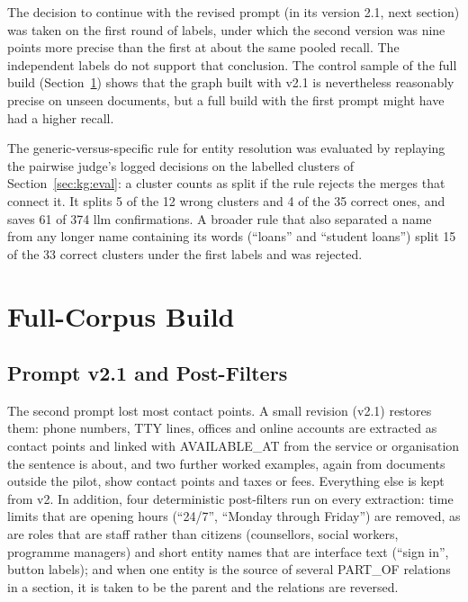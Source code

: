 The decision to continue with the revised prompt (in its version 2.1, next section) was
taken on the first round of labels, under which the second version was nine points more
precise than the first at about the same pooled recall. The independent labels do not
support that conclusion. The control sample of the full build
(Section~\ref{sec:kg:full}) shows that the graph built with v2.1 is nevertheless
reasonably precise on unseen documents, but a full build with the first prompt might have
had a higher recall.

The generic-versus-specific rule for entity resolution was evaluated by replaying the
pairwise judge's logged decisions on the labelled clusters of
Section~\ref{sec:kg:eval}: a cluster counts as split if the rule rejects the merges that
connect it. It splits 5 of the 12 wrong clusters and 4 of the 35 correct ones, and saves
61 of 374 \gls{llm} confirmations. A broader rule that also separated a name from any
longer name containing its words (``loans'' and ``student loans'') split 15 of the 33
correct clusters under the first labels and was rejected.


\section{Full-Corpus Build}\label{sec:kg:full}

\subsection{Prompt v2.1 and Post-Filters}

The second prompt lost most contact points. A small revision (v2.1) restores them:
phone numbers, TTY lines, offices and online accounts are extracted as contact points
and linked with AVAILABLE\_AT from the service or organisation the sentence is about,
and two further worked examples, again from documents outside the pilot, show contact
points and taxes or fees. Everything else is kept from v2. In addition, four
deterministic post-filters run on every extraction: time limits that are opening hours
(``24/7'', ``Monday through Friday'') are removed, as are roles that are staff rather
than citizens (counsellors, social workers, programme managers) and short entity names
that are interface text (``sign in'', button labels); and when one entity is the source
of several PART\_OF relations in a section, it is taken to be the parent and the
relations are reversed.

